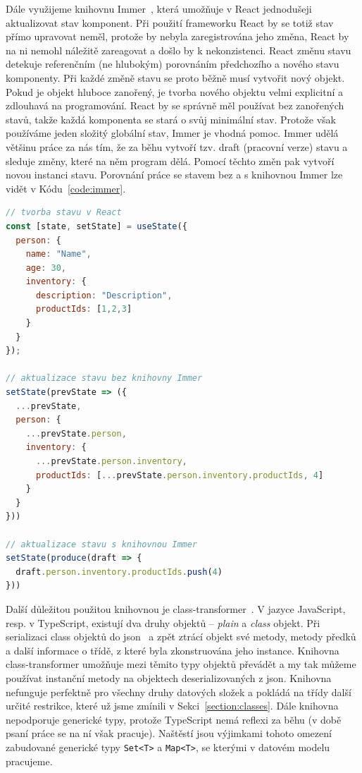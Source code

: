 Dále využijeme knihovnu Immer~\cite{michelweststrate_immer_2017}, která umožňuje v React jednodušeji aktualizovat stav komponent.
Při použití frameworku React by se totiž stav přímo upravovat neměl, protože by nebyla zaregistrována jeho změna, React by na ni nemohl náležitě zareagovat a došlo by k nekonzistenci.
React změnu stavu detekuje referenčním (ne hlubokým) porovnáním předchozího a nového stavu komponenty.
Při každé změně stavu se proto běžně musí vytvořit nový objekt.
Pokud je objekt hluboce zanořený, je tvorba nového objektu velmi explicitní a zdlouhavá na programování.
React by se správně měl používat bez zanořených stavů, takže každá komponenta se stará o svůj minimální stav.
Protože však používáme jeden složitý globální stav, Immer je vhodná pomoc.
Immer udělá většinu práce za nás tím, že za běhu vytvoří tzv. draft (pracovní verze) stavu a sleduje změny, které na něm program dělá.
Pomocí těchto změn pak vytvoří novou instanci stavu.
Porovnání práce se stavem bez a s knihovnou Immer lze vidět v Kódu~\ref{code:immer}.

\begin{lstlisting}[language=JavaScript,float=htb,caption=Použití knihovny Immer,label=code:immer]
// tvorba stavu v React
const [state, setState] = useState({
  person: {
    name: "Name",
    age: 30,
    inventory: {
      description: "Description",
      productIds: [1,2,3]
    }
  }
});

// aktualizace stavu bez knihovny Immer
setState(prevState => ({
  ...prevState,
  person: {
    ...prevState.person,
    inventory: {
      ...prevState.person.inventory,
      productIds: [...prevState.person.inventory.productIds, 4]
    }
  }
}))

// aktualizace stavu s knihovnou Immer
setState(produce(draft => {
  draft.person.inventory.productIds.push(4)
}))
\end{lstlisting}

Další důležitou použitou knihovnou je class-transformer~\cite{attilaolah_classtransformer_2016}.
V jazyce JavaScript, resp. v TypeScript, existují dva druhy objektů -- \emph{plain} a \emph{class} objekt.
Při serializaci class objektů do \acrshort{json}~\cite{tc39group_jsondata_2017} a zpět ztrácí objekt své metody, metody předků a další informace o třídě, z které byla zkonstruována jeho instance.
Knihovna class-transformer umožňuje mezi těmito typy objektů převádět a my tak můžeme používat instanční metody na objektech deserializovaných z \acrshort{json}.
Knihovna nefunguje perfektně pro všechny druhy datových složek a pokládá na třídy další určité restrikce, které už jsme zmínili v Sekci~\ref{section:classes}.
Dále knihovna nepodporuje generické typy, protože TypeScript nemá reflexi za běhu (v době psaní práce se na ní však pracuje).
Naštěstí jsou výjimkami tohoto omezení zabudované generické typy \texttt{Set<T>} a \texttt{Map<T>}, se kterými v datovém modelu pracujeme.

